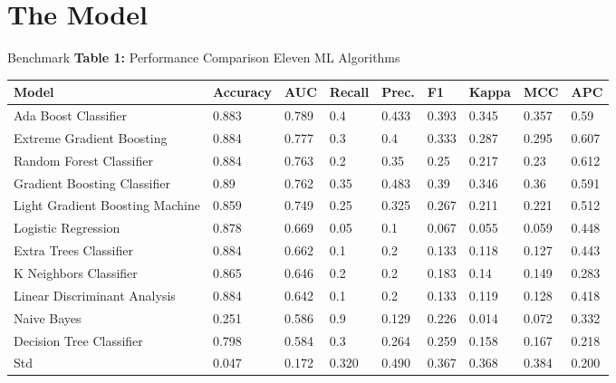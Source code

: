 \documentclass[
  10pt,
  ignorenonframetext,
  fontset=fandol]{beamer}
\begin{document}
\hypertarget{the-model}{%
\section{The Model}\label{the-model}}

\begin{frame}{Benchmark}
\protect\hypertarget{benchmark}{}
\textbf{Table 1:} Performance Comparison Eleven ML Algorithms \centering
\tiny

\begin{table}[]
\begin{tabular}{lllllllll} \hline
Model                           & Accuracy & AUC   & Recall & Prec. & F1    & Kappa & MCC   & APC   \\ \hline
Ada Boost Classifier            & 0.883    & 0.789 & 0.4    & 0.433 & 0.393 & 0.345 & 0.357 & 0.59  \\ 
Extreme Gradient Boosting       & 0.884    & 0.777 & 0.3    & 0.4   & 0.333 & 0.287 & 0.295 & 0.607 \\
Random Forest Classifier        & 0.884    & 0.763 & 0.2    & 0.35  & 0.25  & 0.217 & 0.23  & 0.612 \\
Gradient Boosting Classifier    & 0.89     & 0.762 & 0.35   & 0.483 & 0.39  & 0.346 & 0.36  & 0.591 \\
Light Gradient Boosting Machine & 0.859    & 0.749 & 0.25   & 0.325 & 0.267 & 0.211 & 0.221 & 0.512 \\
Logistic Regression             & 0.878    & 0.669 & 0.05   & 0.1   & 0.067 & 0.055 & 0.059 & 0.448 \\
Extra Trees Classifier          & 0.884    & 0.662 & 0.1    & 0.2   & 0.133 & 0.118 & 0.127 & 0.443 \\
K Neighbors Classifier          & 0.865    & 0.646 & 0.2    & 0.2   & 0.183 & 0.14  & 0.149 & 0.283 \\
Linear Discriminant Analysis    & 0.884    & 0.642 & 0.1    & 0.2   & 0.133 & 0.119 & 0.128 & 0.418 \\
Naive Bayes                     & 0.251    & 0.586 & 0.9    & 0.129 & 0.226 & 0.014 & 0.072 & 0.332 \\
Decision Tree Classifier        & 0.798    & 0.584 & 0.3    & 0.264 & 0.259 & 0.158 & 0.167 & 0.218 \\
Std                             & 0.047    & 0.172 & 0.320  & 0.490 & 0.367 & 0.368 & 0.384 & 0.200 \\ \hline
\end{tabular}
\end{table}
\end{frame}
\end{document}
